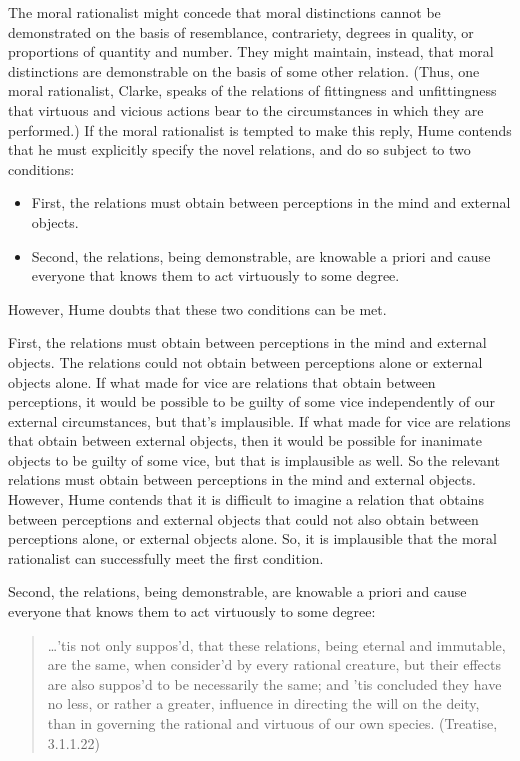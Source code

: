The moral rationalist might concede that moral distinctions cannot be demonstrated on the basis of resemblance, contrariety, degrees in quality, or proportions of quantity and number. They might maintain, instead, that moral distinctions are demonstrable on the basis of some other relation. (Thus, one moral rationalist, Clarke, speaks of the relations of fittingness and unfittingness that virtuous and vicious actions bear to the circumstances in which they are performed.) If the moral rationalist is tempted to make this reply, Hume contends that he must explicitly specify the novel relations, and do so subject to two conditions:

\begin{itemize}
	\item First, the relations must obtain between perceptions in the mind and external objects.
	\item Second, the relations, being demonstrable, are knowable a priori and cause everyone that knows them to act virtuously to some degree.
\end{itemize}

However, Hume doubts that these two conditions can be met.

First, the relations must obtain between perceptions in the mind and external objects. The relations could not obtain between perceptions alone or external objects alone. If what made for vice are relations that obtain between perceptions, it would be possible to be guilty of some vice independently of our external circumstances, but that's implausible. If what made for vice are relations that obtain between external objects, then it would be possible for inanimate objects to be guilty of some vice, but that is implausible as well. So the relevant relations must obtain between perceptions in the mind and external objects. However, Hume contends that it is difficult to imagine a relation that obtains between perceptions and external objects that could not also obtain between perceptions alone, or external objects alone. So, it is implausible that the moral rationalist can successfully meet the first condition.

Second, the relations, being demonstrable, are knowable a priori and cause everyone that knows them to act virtuously to some degree:

\begin{quote}
	\ldots 'tis not only suppos'd, that these relations, being eternal and immutable, are the same, when consider'd by every rational creature, but their effects are also suppos'd to be necessarily the same; and 'tis concluded they have no less, or rather a greater, influence in directing the will on the deity, than in governing the rational and virtuous of our own species. (Treatise, 3.1.1.22)
\end{quote}


